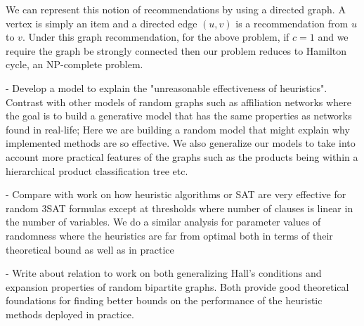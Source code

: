 We can represent this notion of recommendations by using a directed graph. A
vertex is simply an item and a directed edge $(u, v)$ is a recommendation from
$u$ to $v$. Under this graph recommendation, for the above problem, if $c=1$ and
we require the graph be strongly connected then our problem reduces to Hamilton
cycle, an NP-complete problem. \vs


- Develop a model to explain the "unreasonable effectiveness of heuristics". Contrast with other models of random graphs such as affiliation networks where the goal is to build a generative model that has the same properties as networks found in real-life; Here we are building a random model that might explain why implemented methods are so effective. We also generalize our models to take into account more practical features of the graphs such as the products being within a hierarchical product classification tree etc.

- Compare with work on how heuristic algorithms or SAT are very effective for random 3SAT formulas except at thresholds where number of clauses is linear in the number of variables. We do a similar analysis for parameter values of randomness where the heuristics are far from optimal both in terms of their theoretical bound as well as in practice

- Write about relation to work on both generalizing Hall's conditions and expansion properties of random bipartite graphs. Both provide good theoretical foundations for finding better bounds on the performance of the heuristic methods deployed in practice.




